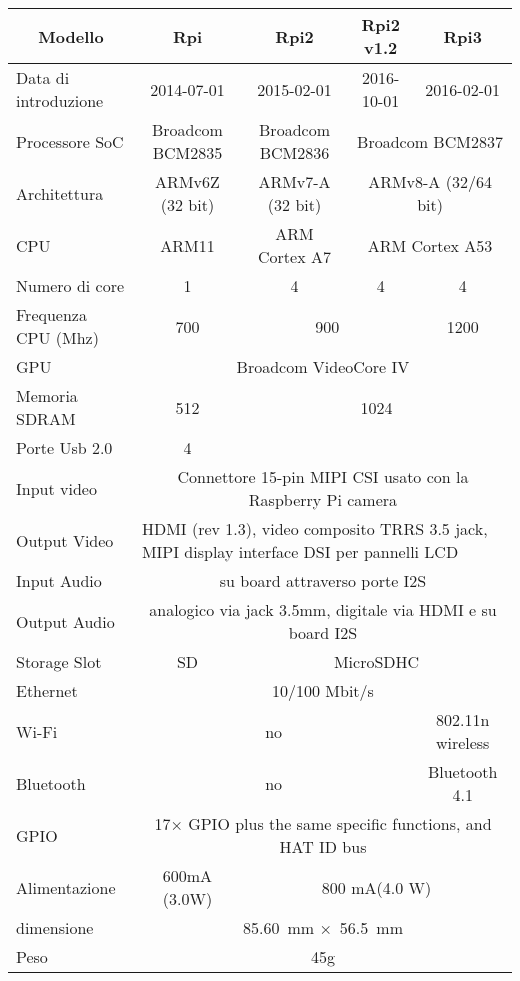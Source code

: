 \begin{landscape}
\begin{table}[htbp]
	\caption{}
	\begin{tabular}{|l|c|c|c|c|}
		\hline
		\multicolumn{1}{|c|}{\textbf{Modello}} & \textbf{Rpi} & \textbf{Rpi2} & \textbf{Rpi2 v1.2} & \textbf{Rpi3} \\ \hline
		Data di introduzione & 2014-07-01 & 2015-02-01 & 2016-10-01 & 2016-02-01 \\ \hline
		Processore SoC & Broadcom BCM2835 & Broadcom BCM2836 & \multicolumn{ 2}{c|}{Broadcom BCM2837} \\ \hline
		Architettura & ARMv6Z (32 bit) & ARMv7-A (32 bit) & \multicolumn{ 2}{c|}{ARMv8-A (32/64 bit)} \\ \hline
		CPU & ARM11 & ARM Cortex A7 & \multicolumn{ 2}{c|}{ARM Cortex A53} \\ \hline
		Numero di core & 1 & 4 & 4 & 4 \\ \hline
		Frequenza CPU (Mhz) & 700 & \multicolumn{ 2}{c|}{900} & 1200 \\ \hline
		GPU & \multicolumn{ 4}{c|}{Broadcom VideoCore IV} \\ \hline
		Memoria SDRAM & 512 & \multicolumn{ 3}{c|}{1024} \\ \hline
		Porte Usb 2.0 & 4 &  &  &  \\ \hline
		Input video & \multicolumn{ 4}{c|}{Connettore 15-pin MIPI  CSI usato con la Raspberry Pi camera} \\ \hline
		Output Video & \multicolumn{ 4}{l|}{HDMI (rev 1.3), video composito TRRS 3.5 jack, MIPI display interface DSI per pannelli LCD} \\ \hline
		Input Audio & \multicolumn{ 4}{c|}{su board attraverso porte I2S} \\ \hline
		Output Audio & \multicolumn{ 4}{c|}{analogico via jack 3.5mm, digitale via HDMI e su board I2S} \\ \hline
		Storage Slot & SD & \multicolumn{ 3}{c|}{MicroSDHC} \\ \hline
		Ethernet & \multicolumn{ 4}{c|}{10/100 Mbit/s} \\ \hline
		Wi-Fi & \multicolumn{ 3}{c|}{no} & 802.11n wireless \\ \hline
		Bluetooth & \multicolumn{ 3}{c|}{no} & Bluetooth 4.1 \\ \hline
		GPIO & \multicolumn{ 4}{c|}{17× GPIO plus the same specific functions, and HAT ID bus } \\ \hline
		Alimentazione & 600mA (3.0W) & \multicolumn{ 3}{c|}{800 mA(4.0 W)} \\ \hline
		dimensione & \multicolumn{ 4}{c|}{85.60 mm × 56.5 mm } \\ \hline
		Peso  & \multicolumn{ 4}{c|}{45g} \\ \hline
	\end{tabular}
	\label{}
\end{table}

\end{landscape}




